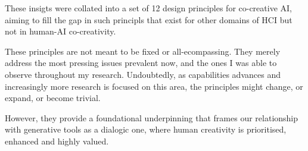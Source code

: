 These insigts were collated into a set of 12 design principles for co-creative AI, aiming to fill the gap in such principls that exist for other domains of HCI but not in human-AI co-creativity. 

These principles are not meant to be fixed or all-ecompassing. They merely address the most pressing issues prevalent now, and the ones I was able to observe throughout my research. Undoubtedly, as capabilities advances and increasingly more research is focused on this area, the principles might change, or expand, or become trivial. 

However, they provide a foundational underpinning that frames our relationship with generative tools as a dialogic one, where human creativity is prioritised, enhanced and highly valued. 



